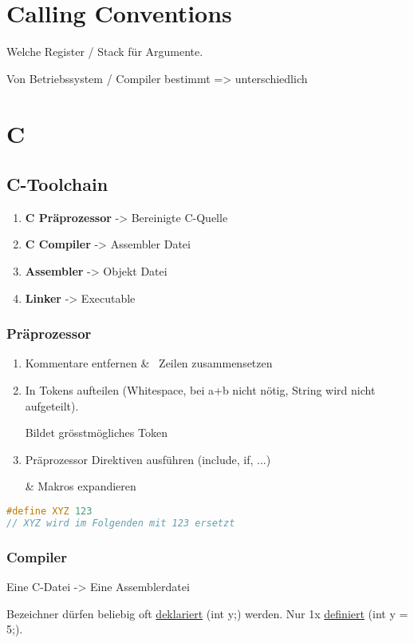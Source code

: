 \begin{multicols*}{4}
\section{Calling Conventions}
Welche Register / Stack für Argumente.

Von Betriebssystem / Compiler bestimmt => unterschiedlich

\section{C}
\subsection{C-Toolchain}
\begin{enumerate}
    \item \textbf{C Präprozessor} -> Bereinigte C-Quelle
    \item \textbf{C Compiler} -> Assembler Datei
    \item \textbf{Assembler} -> Objekt Datei
    \item \textbf{Linker} -> Executable
\end{enumerate}
\subsubsection{Präprozessor}
\begin{enumerate}
    \item Kommentare entfernen \& \ Zeilen zusammensetzen
    \item In Tokens aufteilen (Whitespace, bei a+b nicht nötig, String wird nicht aufgeteilt).

    Bildet grösstmögliches Token
    \item Präprozessor Direktiven ausführen (include, if, ...)

    \& Makros expandieren
\end{enumerate}
\begin{lstlisting}[language=c]
#define XYZ 123
// XYZ wird im Folgenden mit 123 ersetzt
\end{lstlisting}

\subsubsection{Compiler}
Eine C-Datei -> Eine Assemblerdatei

Bezeichner dürfen beliebig oft \underline{deklariert} (int y;) werden. Nur 1x \underline{definiert} (int y = 5;).


\end{multicols*}
